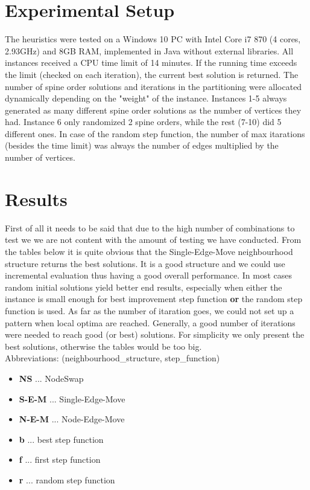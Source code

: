 \documentclass[11pt]{article}
\begin{document}
\section{Experimental Setup}
\hspace{0.5cm} The heuristics were tested on a Windows 10 PC with Intel Core i7 870 (4 cores, 2.93GHz) and 8GB RAM, implemented in Java without external libraries. All instances received a CPU time limit of 14 minutes. If the running time exceeds the limit (checked on each iteration), the current best solution is returned. The number of spine order solutions and iterations in the partitioning were allocated dynamically depending on the "weight" of the instance. Instances 1-5 always generated as many different spine order solutions as the number of vertices they had. Instance 6 only randomized 2 spine orders, while the rest (7-10) did 5 different ones. In case of the random step function, the number of max itarations (besides the time limit) was always the number of edges multiplied by the number of vertices.
\newpage
\section{Results}
\hspace{0.5cm}First of all it needs to be said that due to the high number of combinations to test we we are not content with the amount of testing we have conducted. From the tables below it is quite obvious that the Single-Edge-Move neighbourhood structure returns the best solutions. It is a good structure and we could use incremental evaluation thus having a good overall performance. In most cases random initial solutions yield better end results, especially when either the instance is small enough for best improvement step function \textbf{or} the random step function is used. As far as the number of itaration goes, we could not set up a pattern when local optima are reached. Generally, a good number of iterations were needed to reach good (or best) solutions. For simplicity we only present the best solutions, otherwise the tables would be too big.\\
\newline
Abbreviations: (neighbourhood\_structure, step\_function)
\begin{itemize}
	\item \textbf{NS} ... NodeSwap
	\item \textbf{S-E-M} ... Single-Edge-Move
	\item \textbf{N-E-M} ... Node-Edge-Move
	\item \textbf{b} ... best step function
	\item \textbf{f} ... first step function
	\item \textbf{r} ... random step function
\end{itemize}
\end{document}
